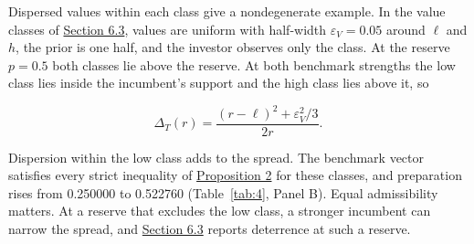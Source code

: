 Dispersed values within each class give a nondegenerate example. In the
value classes of \hyperref[sec-design]{Section 6.3}, values are uniform
with half-width \(\varepsilon_V=0.05\) around \(\ell\) and \(h\), the
prior is one half, and the investor observes only the class. At the
reserve \(p=0.5\) both classes lie above the reserve. At both benchmark
strengths the low class lies inside the incumbent's support and the high
class lies above it, so

\[
\Delta_T(r)=\frac{(r-\ell)^2+\varepsilon_V^2/3}{2r}.
\]

Dispersion within the low class adds to the spread. The benchmark vector
satisfies every strict inequality of
\hyperref[result-proposition-2]{Proposition 2} for these classes, and
preparation rises from 0.250000 to 0.522760 (Table~\ref{tab:4}, Panel
B). Equal admissibility matters. At a reserve that excludes the low
class, a stronger incumbent can narrow the spread, and
\hyperref[sec-design]{Section 6.3} reports deterrence at such a reserve.
